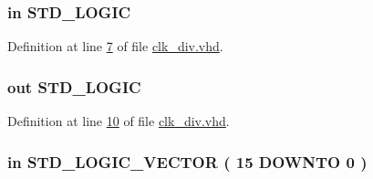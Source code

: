\subsubsection[{clk\+\_\+in}]{ {\bfseries \textcolor{keywordflow}{in}\textcolor{vhdlchar}{ }} {\bfseries \textcolor{comment}{S\+T\+D\+\_\+\+L\+O\+G\+I\+C}\textcolor{vhdlchar}{ }} \hspace{0.3cm}{\ttfamily [Port]}}\label{classclk__div_a57fad7f33f7766724bdea76e7b0330ef}


Definition at line \hyperlink{clk__div_8vhd_source_l00007}{7} of file \hyperlink{clk__div_8vhd_source}{clk\+\_\+div.\+vhd}.

\hypertarget{classclk__div_a8147ca5cedee84ed9753ac6f1f0b2374}{}
\subsubsection[{clk\+\_\+out}]{ {\bfseries \textcolor{keywordflow}{out}\textcolor{vhdlchar}{ }} {\bfseries \textcolor{comment}{S\+T\+D\+\_\+\+L\+O\+G\+I\+C}\textcolor{vhdlchar}{ }} \hspace{0.3cm}{\ttfamily [Port]}}\label{classclk__div_a8147ca5cedee84ed9753ac6f1f0b2374}


Definition at line \hyperlink{clk__div_8vhd_source_l00010}{10} of file \hyperlink{clk__div_8vhd_source}{clk\+\_\+div.\+vhd}.

\hypertarget{classclk__div_a425c2042b3ea21827b9b29c6712312d9}{}
\subsubsection[{div}]{ {\bfseries \textcolor{keywordflow}{in}\textcolor{vhdlchar}{ }} {\bfseries \textcolor{comment}{S\+T\+D\+\_\+\+L\+O\+G\+I\+C\+\_\+\+V\+E\+C\+T\+O\+R}\textcolor{vhdlchar}{ }\textcolor{vhdlchar}{(}\textcolor{vhdlchar}{ }\textcolor{vhdlchar}{ } \textcolor{vhdldigit}{15} \textcolor{vhdlchar}{ }\textcolor{keywordflow}{D\+O\+W\+N\+T\+O}\textcolor{vhdlchar}{ }\textcolor{vhdlchar}{ } \textcolor{vhdldigit}{0} \textcolor{vhdlchar}{ }\textcolor{vhdlchar}{)}\textcolor{vhdlchar}{ }} \hspace{0.3cm}{\ttfamily [Port]}}\label{classclk__div_a425c2042b3ea21827b9b29c6712312d9}


